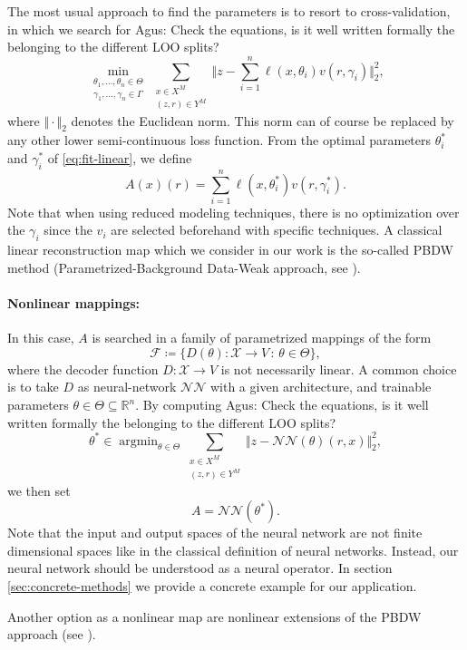 \documentclass[11pt,a4paper,twoside]{article}
\newcommand{\ascomment}[1]{{\color{teal} Agus: #1}}
\theoremstyle{definition}
\numberwithin{equation}{section}
\newcommand{\cF}{\ensuremath{\mathcal{F}}}
\newcommand{\cN}{\ensuremath{\mathcal{N}}}
\newcommand{\cX}{\ensuremath{\mathcal{X}}}
\newcommand{\bR}{\ensuremath{\mathbb{R}}}
\newcommand{\<}{\langle}
\renewcommand{\>}{\rangle}
\newcommand{\argmin}{\operatorname{argmin}}
\newcommand{\cond}{\ensuremath{\,:\,}}
\begin{document}
The most usual approach to find the parameters is to resort to cross-validation, in which we search for
\ascomment{Check the equations, is it well written formally the belonging to the different LOO splits?}
\begin{equation}
\label{eq:fit-linear}
\min_{ \substack{\theta_1,\dots, \theta_n \in \Theta \\ \gamma_1,\dots, \gamma_n \in \Gamma}}
\sum_{ \substack{x\in X^{M} \\ (z, r)\in Y^{M}}}
\Vert z - \sum_{i=1}^n \ell(x, \theta_i) v(r, \gamma_i) \Vert^2_2,
\end{equation}
where $\Vert \cdot \Vert_2$ denotes the Euclidean norm. This norm can of course be replaced by any other lower semi-continuous loss function. From the optimal parameters $\theta_i^*$ and $\gamma_i^*$ of \eqref{eq:fit-linear}, we define
$$
A(x)(r) = \sum_{i=1}^n \ell(x, \theta_i^*) v(r, \gamma^*_i).
$$
Note that when using reduced modeling techniques, there is no optimization over the $\gamma_i$ since the $v_i$ are selected beforehand with specific techniques. A classical linear reconstruction map which we consider in our work is the so-called PBDW method (Parametrized-Background Data-Weak approach, see \cite{MPPY2015, BCDDPW2017, Mula2023}).

\paragraph{Nonlinear mappings:} In this case, $A$ is searched in a family of parametrized mappings of the form
$$
\cF \coloneqq \{ D(\theta): \cX \to V   \cond \theta \in \Theta  \},
$$
where the decoder function $D:\cX\to V$ is not necessarily linear. A common choice is to take $D$ as neural-network $\cN\cN$ with a given architecture, and trainable parameters $\theta \in \Theta\subseteq \bR^n$. By computing
\ascomment{Check the equations, is it well written formally the belonging to the different LOO splits?}
$$
\theta^* \in \argmin_{\theta \in \Theta}
\sum_{\substack{x\in X^{M} \\ (z, r)\in Y^{M}}}
\Vert z - \cN\cN(\theta)(r, x) \Vert^2_2,
$$
we then set
$$
A = \cN\cN(\theta^*).
$$
Note that the input and output spaces of the neural network are not finite dimensional spaces like in the classical definition of neural networks. Instead, our neural network should be understood as a neural operator. In section \ref{sec:concrete-methods} we provide a concrete example for our application.

Another option as a nonlinear map are nonlinear extensions of the PBDW approach (see \cite{CDMN2022,CDMS2022}).
\end{document}
